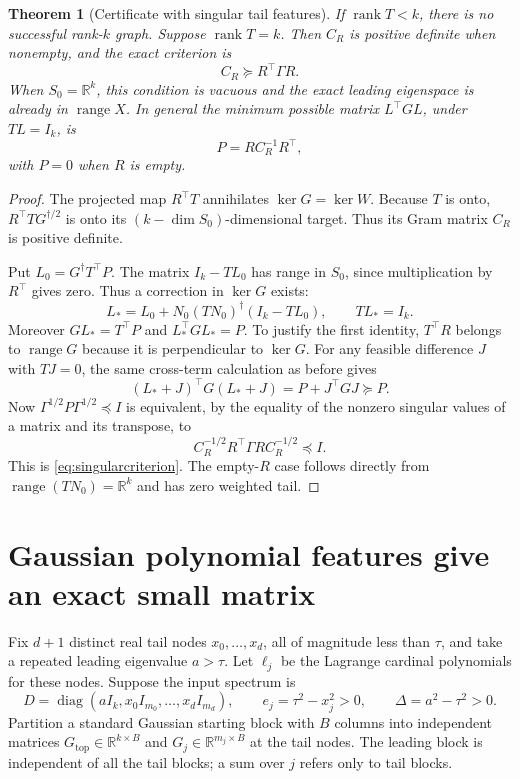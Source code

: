 \documentclass[11pt]{article}
\newtheorem{theorem}{Theorem}[section]
\theoremstyle{definition}
\newcommand{\R}{\mathbb R}
\newcommand{\ran}{\operatorname{range}}
\newcommand{\rank}{\operatorname{rank}}
\newcommand{\diag}{\operatorname{diag}}
\begin{document}
\begin{theorem}[Certificate with singular tail features]\label{thm:singular}
If $\rank T<k$, there is no successful rank-$k$ graph. Suppose $\rank T=k$. Then $C_R$ is positive definite when nonempty, and the exact criterion is
\begin{equation}\label{eq:singularcriterion}
 C_R\succeq R^\top\Gamma R.
\end{equation}
When $S_0=\R^k$, this condition is vacuous and the exact leading eigenspace is already in $\ran X$. In general the minimum possible matrix $L^\top GL$, under $TL=I_k$, is
\begin{equation}\label{eq:minimumenergy}
 P=R C_R^{-1}R^\top,
\end{equation}
with $P=0$ when $R$ is empty.
\end{theorem}
\begin{proof}
The projected map $R^\top T$ annihilates $\ker G=\ker W$. Because $T$ is onto, $R^\top T G^{\dagger/2}$ is onto its $(k-\dim S_0)$-dimensional target. Thus its Gram matrix $C_R$ is positive definite.

Put $L_0=G^\dagger T^\top P$. The matrix $I_k-TL_0$ has range in $S_0$, since multiplication by $R^\top$ gives zero. Thus a correction in $\ker G$ exists:
\[
 L_*=L_0+N_0(TN_0)^\dagger(I_k-TL_0),\qquad TL_*=I_k.
\]
Moreover $GL_*=T^\top P$ and $L_*^\top GL_*=P$. To justify the first identity, $T^\top R$ belongs to $\ran G$ because it is perpendicular to $\ker G$. For any feasible difference $J$ with $TJ=0$, the same cross-term calculation as before gives
\[
 (L_*+J)^\top G(L_*+J)=P+J^\top GJ\succeq P.
\]
Now $\Gamma^{1/2}P\Gamma^{1/2}\preceq I$ is equivalent, by the equality of the nonzero singular values of a matrix and its transpose, to
\[
 C_R^{-1/2}R^\top\Gamma R C_R^{-1/2}\preceq I.
\]
This is \eqref{eq:singularcriterion}. The empty-$R$ case follows directly from $\ran(TN_0)=\R^k$ and has zero weighted tail.
\end{proof}

\section{Gaussian polynomial features give an exact small matrix}\label{sec:gaussian}
Fix $d+1$ distinct real tail nodes $x_0,\ldots,x_d$, all of magnitude less than $\tau$, and take a repeated leading eigenvalue $a>\tau$. Let $\ell_j$ be the Lagrange cardinal polynomials for these nodes. Suppose the input spectrum is
\[
 D=\diag(aI_k,x_0I_{m_0},\ldots,x_dI_{m_d}),\qquad
 e_j=\tau^2-x_j^2>0,\qquad \Delta=a^2-\tau^2>0.
\]
Partition a standard Gaussian starting block with $B$ columns into independent matrices $G_{\mathrm{top}}\in\R^{k\times B}$ and $G_j\in\R^{m_j\times B}$ at the tail nodes. The leading block is independent of all the tail blocks; a sum over $j$ refers only to tail blocks.
\end{document}
